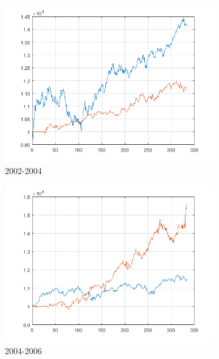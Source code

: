 \documentclass[11pt,a4,twosided,singlespacing,titlepagenumber=on]{scrreprt}
\numberwithin{equation}{chapter} %
\theoremstyle{remark}
\begin{document}
\begin{figure}[H]
\begin{subfigure}[t]{0.32\textwidth}
        \includegraphics[width=1\textwidth]{res/backtest_cpx/7}
        \caption{2002-2004}
    \end{subfigure}
    \begin{subfigure}[t]{0.32\textwidth}
        \centering
        \includegraphics[width=1\textwidth]{res/backtest_cpx/8}
        \caption{2004-2006}
    \end{subfigure}
    \begin{subfigure}[t]{0.32\textwidth}
        \centering

\end{subfigure}
\end{figure}
\end{document}
